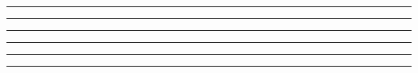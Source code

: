 \documentclass{article}
\begin{document}


\rule{\textwidth}{1pt}



\rule{\textwidth}{1pt}



\rule{\textwidth}{1pt}



\rule{\textwidth}{1pt}



\rule{\textwidth}{1pt}



\rule{\textwidth}{1pt}
\end{document}
